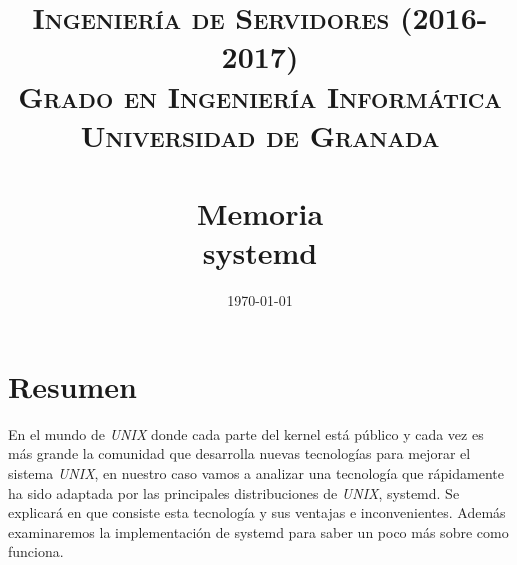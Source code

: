 


\title{	
\normalfont \normalsize 
\textsc{\textbf{Ingeniería de Servidores (2016-2017)} \\ Grado en Ingeniería Informática \\ Universidad de Granada} \\ [25pt] %
\horrule{0.5pt} \\[0.4cm] %
\huge Memoria \\ %
systemd
\horrule{2pt} \\[0.5cm] %
}

\date{\normalsize\today} %




\maketitle %

\newpage


\section{Resumen}%
En el mundo de \textit{UNIX} donde cada parte del kernel está público y 
cada vez es más grande la comunidad que desarrolla nuevas tecnologías 
para mejorar el sistema \textit{UNIX}, en nuestro caso vamos a analizar
una tecnología que rápidamente ha sido adaptada por las principales 
distribuciones de \textit{UNIX}, systemd. Se explicará en que consiste esta 
tecnología y sus ventajas e inconvenientes. Además examinaremos la
 implementación de systemd para saber un poco más sobre como funciona.


